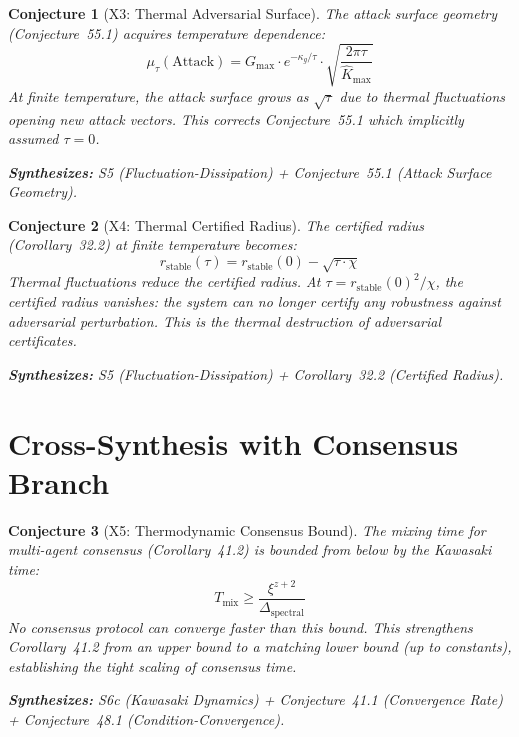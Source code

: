\documentclass[11pt,letterpaper]{article}
\newtheorem{conjecture}{Conjecture}[section]
\newcommand{\Khat}{\hat{K}}
\begin{document}
\begin{conjecture}[X3: Thermal Adversarial 
Surface]\label{conj:x_adversarial}
The attack surface geometry (Conjecture~55.1) acquires temperature 
dependence:
\begin{equation}
    \mu_\tau(\text{Attack}) = G_{\max} \cdot 
    e^{-\kappa_g / \tau} \cdot \sqrt{\frac{2\pi\tau}{\Khat_{\max}}}
\end{equation}
At finite temperature, the attack surface grows as $\sqrt{\tau}$ due to 
thermal fluctuations opening new attack vectors. This corrects 
Conjecture~55.1 which implicitly assumed $\tau = 0$.

\textbf{Synthesizes:} S5 (Fluctuation-Dissipation) + Conjecture~55.1 
(Attack Surface Geometry).
\end{conjecture}

\begin{conjecture}[X4: Thermal Certified 
Radius]\label{conj:x_certified}
The certified radius (Corollary~32.2) at finite temperature becomes:
\begin{equation}
    r_{\mathrm{stable}}(\tau) = r_{\mathrm{stable}}(0) - 
    \sqrt{\tau \cdot \chi}
\end{equation}
Thermal fluctuations reduce the certified radius. At $\tau = 
r_{\mathrm{stable}}(0)^2 / \chi$, the certified radius vanishes: the 
system can no longer certify any robustness against adversarial 
perturbation. This is the \emph{thermal destruction of adversarial 
certificates}.

\textbf{Synthesizes:} S5 (Fluctuation-Dissipation) + Corollary~32.2 
(Certified Radius).
\end{conjecture}

\section{Cross-Synthesis with Consensus Branch}

\begin{conjecture}[X5: Thermodynamic Consensus 
Bound]\label{conj:x_consensus}
The mixing time for multi-agent consensus (Corollary~41.2) is bounded 
from below by the Kawasaki time:
\begin{equation}
    T_{\mathrm{mix}} \geq \frac{\xi^{z+2}}
    {\Delta_{\mathrm{spectral}}}
\end{equation}
No consensus protocol can converge faster than this bound. This 
strengthens Corollary~41.2 from an upper bound to a matching lower bound 
(up to constants), establishing the tight scaling of consensus time.

\textbf{Synthesizes:} S6c (Kawasaki Dynamics) + Conjecture~41.1 
(Convergence Rate) + Conjecture~48.1 (Condition-Convergence).
\end{conjecture}
\end{document}
